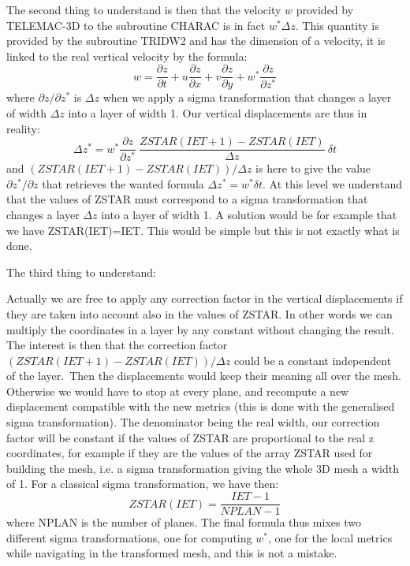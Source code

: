 The second thing to understand is then that the velocity $w$ provided by
TELEMAC-3D to the subroutine CHARAC is in fact $w^{\ast}\Delta z$. This
quantity is provided by the subroutine TRIDW2 and has the dimension of a
velocity, it is linked to the real vertical velocity by the formula:%
\begin{equation}
w=\dfrac{\partial z}{\partial t}+u\dfrac{\partial z}{\partial x}+v\dfrac{\partial
z}{\partial y}+w^{\ast}\dfrac{\partial z}{\partial z^{\ast}}%
\end{equation}
where $\partial z/\partial z^{\ast}$ is $\Delta z$ when we apply a
sigma transformation that changes a layer of width $\Delta z$ into a layer of
width 1. Our vertical displacements are thus in reality:%
\begin{equation}
\Delta z^{\ast}=w^{\ast}\dfrac{\partial z}{\partial z^{\ast}}~\dfrac
{ZSTAR(IET+1)-ZSTAR(IET)}{\Delta z}~\delta t
\end{equation}
and $(ZSTAR(IET+1)-ZSTAR(IET))/\Delta z$ is here to give the value
$\partial z^{\ast}/\partial z$ that retrieves the wanted formula
$\Delta z^{\ast}=w^{\ast}\delta t$. At this level we understand that the
values of ZSTAR must correspond to a sigma transformation that changes a layer
$\Delta z$ into a layer of width 1. A solution would be for example that we
have ZSTAR(IET)=IET. This would be simple but this is not exactly what is done.

The third thing to understand:

Actually we are free to apply any correction factor in the vertical
displacements if they are taken into account also in the values of ZSTAR. In
other words we can multiply the coordinates in a layer by any constant without
changing the result. The interest is then that the correction factor
$(ZSTAR(IET+1)-ZSTAR(IET))/\Delta z$ could be a constant independent of
the layer.\ Then the displacements would keep their meaning all over the mesh.
Otherwise we would have to stop at every plane, and recompute a new
displacement compatible with the new metrics (this is done with the
generalised sigma transformation). The denominator being the real width, our
correction factor will be constant if the values of ZSTAR are proportional to
the real z coordinates, for example if they are the values of the array ZSTAR
used for building the mesh, i.e. a sigma transformation giving the whole 3D
mesh a width of 1. For a classical sigma transformation, we have then:%
\begin{equation}
ZSTAR(IET)=\dfrac{IET-1}{NPLAN-1}%
\end{equation}
where NPLAN is the number of planes. The final formula thus mixes two
different sigma transformations, one for computing $w^{\ast}$, one for the
local metrics while navigating in the transformed mesh, and this is not a mistake.

